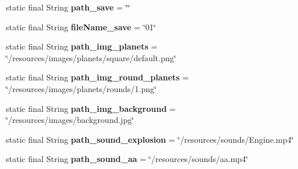 \begin{DoxyCompactItemize}
static final String {\bfseries path\+\_\+save} = \char`\"{}\char`\"{}
\item 
\mbox{\label{classfr_1_1groupe40_1_1projet_1_1util_1_1constants_1_1_constants_afc8ed60e299e64d22be16c0518872a9e}} 
static final String {\bfseries file\+Name\+\_\+save} = \char`\"{}01\char`\"{}
\item 
\mbox{\label{classfr_1_1groupe40_1_1projet_1_1util_1_1constants_1_1_constants_a54fe9c663e5cfe47d9de82899d6ef626}} 
static final String {\bfseries path\+\_\+img\+\_\+planets} = \char`\"{}/resources/images/planets/square/default.\+png\char`\"{}
\item 
\mbox{\label{classfr_1_1groupe40_1_1projet_1_1util_1_1constants_1_1_constants_a0e62f78a467d7bc0642b1b27e7dca312}} 
static final String {\bfseries path\+\_\+img\+\_\+round\+\_\+planets} = \char`\"{}/resources/images/planets/rounds/1.png\char`\"{}
\item 
\mbox{\label{classfr_1_1groupe40_1_1projet_1_1util_1_1constants_1_1_constants_a9406470470fbe8f4ac7b031fa271065d}} 
static final String {\bfseries path\+\_\+img\+\_\+background} = \char`\"{}/resources/images/background.\+jpg\char`\"{}
\item 
\mbox{\label{classfr_1_1groupe40_1_1projet_1_1util_1_1constants_1_1_constants_ae472e3344783d15e8021072f1517c8c6}} 
static final String {\bfseries path\+\_\+sound\+\_\+explosion} = \char`\"{}/resources/sounds/Engine.\+mp4\char`\"{}
\item 
\mbox{\label{classfr_1_1groupe40_1_1projet_1_1util_1_1constants_1_1_constants_a1131d542392526fc1e4000797f3f79e5}} 
static final String {\bfseries path\+\_\+sound\+\_\+aa} = \char`\"{}/resources/sounds/aa.\+mp4\char`\"{}
\item 
\mbox{\label{classfr_1_1groupe40_1_1projet_1_1util_1_1constants_1_1_constants_a087369eaf16bdc63aa572c9d1e7e2d04}} 

\end{DoxyCompactItemize}
